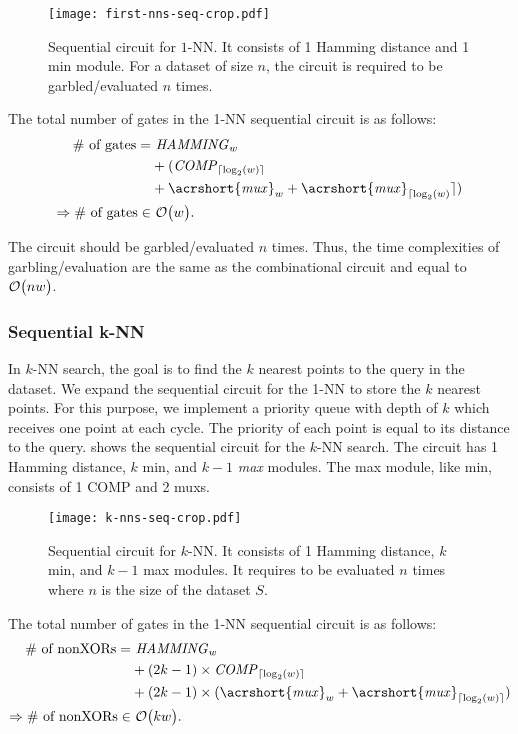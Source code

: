 \begin{figure}
\centering
\texttt{[image: first-nns-seq-crop.pdf]}
\caption{Sequential circuit for $1$-NN.
It consists of 1 Hamming distance and 1 min module.
For a dataset of size $n$, the circuit is required to be garbled/evaluated $n$ times.}
\label{fig:fist-nns-seq}
\end{figure}

The total number of gates in the 1-NN sequential circuit is as follows:
\begin{align*}
\text{\# of gates}=	& ~ \mathit{HAMMING}_{w}\\
					& + (\mathit{COMP}_{\lceil \log _2(w) \rceil} \\
					& + \mathit{\acrshort{mux}}_w + \mathit{\acrshort{mux}}_{\lceil \log _2(w)} \rceil)\\
\Rightarrow \text{\# of gates} \in & ~ \BigO{w}.
\end{align*}

The circuit should be garbled/evaluated $n$ times.
Thus, the time complexities of garbling/evaluation are the same as the combinational circuit and equal to $\mathcal{O}\bigl(nw\bigr)$.

\subsubsection{Sequential k-NN}
In $k$-NN search, the goal is to find the $k$ nearest points to the query in the dataset.
We expand the sequential circuit for the 1-NN to store the $k$ nearest points.
For this purpose, we implement a priority queue with depth of $k$ which receives one point at each cycle.
The priority of each point is equal to its distance to the query.
 shows the sequential circuit for the $k$-NN search.
The circuit has 1 Hamming distance, $k$ min, and $k-1$ \emph{max} modules.
The max module, like min, consists of 1 COMP and 2 \acrshort{mux}s.

\begin{figure}
\centering
\texttt{[image: k-nns-seq-crop.pdf]}
\caption{Sequential circuit for $k$-NN.
It consists of 1 Hamming distance, $k$ min, and $k-1$ max modules.
It requires to be evaluated $n$ times where $n$ is the size of the dataset $S$.}
\label{fig:k-nns-seq}
\end{figure}

The total number of gates in the 1-NN sequential circuit is as follows:
\begin{align*}
\text{\# of nonXORs}=			& ~ \mathit{HAMMING}_{w}\\
								& + (2k-1) \times \mathit{COMP}_{\lceil \log _2(w) \rceil} \\
								& + (2k-1) \times (\mathit{\acrshort{mux}}_w  + \mathit{\acrshort{mux}}_{\lceil \log _2(w) \rceil})\\
\Rightarrow \text{\# of nonXORs} \in & ~ \BigO{kw}.
\end{align*}

